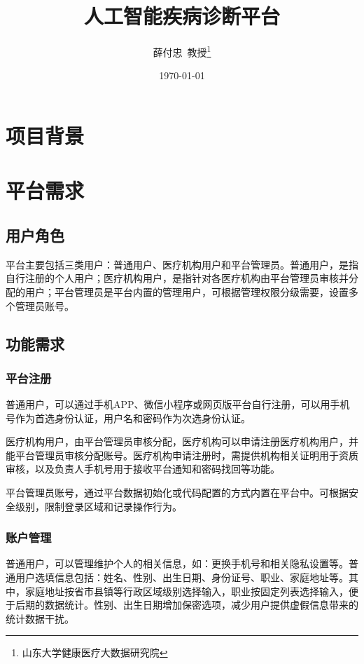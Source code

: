\documentclass[UTF8,a4paper,12pt, onecolumn]{ctexart}
\title{人工智能疾病诊断平台}
\author{薛付忠~教授\thanks{山东大学健康医疗大数据研究院}}
\date{\today}
\begin{document}
    \maketitle
    \thispagestyle{fancy}
    
\tableofcontents

\section{项目背景}



\section{平台需求}

\subsection{用户角色}

平台主要包括三类用户：普通用户、医疗机构用户和平台管理员。普通用户，是指自行注册的个人用户；医疗机构用户，是指针对各医疗机构由平台管理员审核并分配的用户；平台管理员是平台内置的管理用户，可根据管理权限分级需要，设置多个管理员账号。

\subsection{功能需求}

\subsubsection{平台注册}

普通用户，可以通过手机APP、微信小程序或网页版平台自行注册，可以用手机号作为首选身份认证，用户名和密码作为次选身份认证。

医疗机构用户，由平台管理员审核分配，医疗机构可以申请注册医疗机构用户，并能平台管理员审核分配账号。医疗机构申请注册时，需提供机构相关证明用于资质审核，以及负责人手机号用于接收平台通知和密码找回等功能。

平台管理员账号，通过平台数据初始化或代码配置的方式内置在平台中。可根据安全级别，限制登录区域和记录操作行为。

\subsubsection{账户管理}

普通用户，可以管理维护个人的相关信息，如：更换手机号和相关隐私设置等。普通用户选填信息包括：姓名、性别、出生日期、身份证号、职业、家庭地址等。其中，家庭地址按省市县镇等行政区域级别选择输入，职业按固定列表选择输入，便于后期的数据统计。性别、出生日期增加保密选项，减少用户提供虚假信息带来的统计数据干扰。
\end{document}
